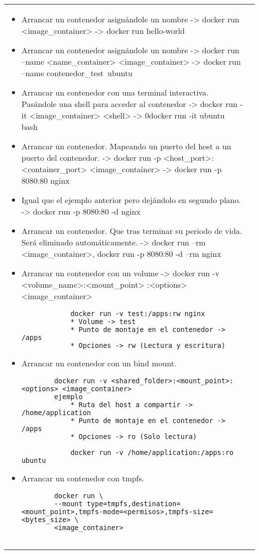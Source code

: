 \documentclass[letterpaper,11pt]{article}
\begin{document}
\begin{tabular*}{7in}{l@{\extracolsep{\fill}}r}
    \begin{itemize}
        \item Arrancar un contenedor asignándole un nombre -> docker run <image\_container> -> docker run hello-world
        \item Arrancar un contenedor asignándole un nombre -> docker run --name <name\_container> <image\_container> -> docker run --name contenedor\_test\ ubuntu 
        \item Arrancar un contenedor con una terminal interactiva. Pasándole una shell para acceder al contenedor -> docker run -it <image\_container> <shell> -> 0docker run -it ubuntu bash
        \item Arrancar un contenedor. Mapeando un puerto del host a un puerto del contenedor. -> docker run -p <host\_port>:<container\_port> <image\_container> -> docker run -p 8080:80 nginx 
        \item Igual que el ejemplo anterior pero dejándolo en segundo plano. -> docker run -p 8080:80 -d nginx
        \item Arrancar un contenedor. Que tras terminar su periodo de vida. Será eliminado automáticamente. -> docker run --rm <image\_container>, docker run -p 8080:80 -d --rm nginx
        \item Arrancar un contenedor con un volume -> docker run -v <volume\_name>:<mount\_point>
        :<options> <image\_container>
        \begin{lstlisting}
            docker run -v test:/apps:rw nginx
            * Volume -> test
            * Punto de montaje en el contenedor -> /apps
            * Opciones -> rw (Lectura y escritura)
        \end{lstlisting}
        \item Arrancar un contenedor con un bind mount. 
        \begin{lstlisting}
        docker run -v <shared_folder>:<mount_point>:<options> <image_container>
        ejemplo
            * Ruta del host a compartir -> /home/application
            * Punto de montaje en el contenedor -> /apps
            * Opciones -> ro (Solo lectura)
    
            docker run -v /home/application:/apps:ro ubuntu
        \end{lstlisting}
        \item  Arrancar un contenedor con tmpfs. 
        \begin{lstlisting}
        docker run \
        --mount type=tmpfs,destination=<mount_point>,tmpfs-mode=<permisos>,tmpfs-size=<bytes_size> \
        <image_container>
        

\end{lstlisting}
\end{itemize}
\end{tabular*}
\end{document}
